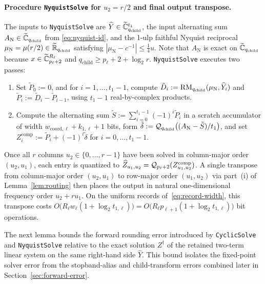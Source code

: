 \paragraph{Procedure \texttt{NyquistSolve} for $u_2 = r/2$ and final output transpose.}
The inputs to \texttt{NyquistSolve} are $\widehat{Y} \in \widetilde{\mathbb{C}}_{q_{\mathrm{child}}}^{t_1}$, the input alternating sum $A_{\mathrm{N}} \in \widetilde{\mathbb{C}}_{q_{\mathrm{child}}}$ from \eqref{eq:nyquist-id}, and the 1-ulp faithful Nyquist reciprocal $\mu_{\mathrm{N}} = \mu(r/2) \in \widetilde{\mathbb{R}}_{q_{\mathrm{child}}}$ satisfying $|\mu_{\mathrm{N}} - c^{-1}| \le \frac{1}{4}u$. Note that $A_{\mathrm{N}}$ is exact on $\widetilde{\mathbb{C}}_{q_{\mathrm{child}}}$ because $x \in \widetilde{\mathbb{C}}_{p_\ell+2}^{R_\ell}$ and $q_{\mathrm{child}} \ge p_\ell + 2 + \log_2 r$. \texttt{NyquistSolve} executes two passes:
\begin{enumerate}[label=\arabic*.,leftmargin=*]
  \item Set $\tilde{P}_0 := 0$, and for $i = 1, \dots, t_1-1$, compute $\tilde{D}_i := \operatorname{RM}_{q_{\mathrm{child}}}(\mu_{\mathrm{N}}, \widehat{Y}_i)$ and $\tilde{P}_i := \tilde{D}_i - \tilde{P}_{i-1}$, using $t_1 - 1$ real-by-complex products.
  \item Compute the alternating sum $\tilde{S} := \sum_{i=0}^{t_1-1} (-1)^i \tilde{P}_i$ in a scratch accumulator of width $w_{\mathrm{coord},\ell} + k_{1,\ell} + 1$ bits, form $\tilde{\delta} := \mathcal{Q}_{q_{\mathrm{child}}}\bigl((A_{\mathrm{N}} - \tilde{S}) / t_1\bigr)$, and set $Z^{\mathrm{comp}}_i := \tilde{P}_i + (-1)^i \tilde{\delta}$ for $i = 0, \dots, t_1-1$.
\end{enumerate}
Once all $r$ columns $u_2 \in \{0, \dots, r-1\}$ have been solved in column-major order $(u_2, u_1)$, each entry is quantized to $\widehat{Z}_{u_1, u_2} = \mathcal{Q}_{p_\ell+2}(Z^{\mathrm{comp}}_{u_1, u_2})$. A single transpose from column-major order $(u_2, u_1)$ to row-major order $(u_1, u_2)$ via part~(i) of Lemma~\ref{lem:routing} then places the output in natural one-dimensional frequency order $u_2 + r u_1$. On the uniform records of~\eqref{eq:record-width}, this transpose costs $O\bigl(R_\ell w_\ell (1 + \log_2 t_{1,\ell})\bigr) = O\bigl(R_\ell p_{\ell+1} (1 + \log_2 t_{1,\ell})\bigr)$ bit operations.

The next lemma bounds the forward rounding error introduced by \texttt{CyclicSolve} and \texttt{NyquistSolve} relative to the exact solution $Z^\dagger$ of the retained two-term linear system on the same right-hand side $\widehat{Y}$. This bound isolates the fixed-point solver error from the stopband-alias and child-transform errors combined later in Section~\ref{sec:forward-error}.

